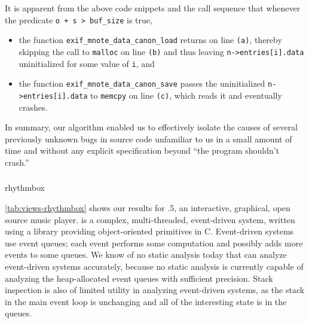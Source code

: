 It is apparent from the above code snippets and the
call sequence that whenever the predicate \texttt{o + s > buf\_size} is true,
\begin{itemize}
\item the function \texttt{exif\_mnote\_data\_canon\_load} returns on
  line \texttt{(a)}, thereby skipping the call to \texttt{malloc} on
  line \texttt{(b)} and thus leaving \texttt{n->entries[i].data}
  uninitialized for some value of \texttt{i}, and

\item the function \texttt{exif\_mnote\_data\_canon\_save} passes the
  uninitialized \texttt{n->entries[i].data} to \texttt{memcpy} on line \texttt{(c)}, which reads it and eventually crashes.
\end{itemize}

In summary, our algorithm enabled us to effectively isolate the causes
of several previously unknown bugs in source code unfamiliar to us in
a small amount of time and without any explicit specification beyond
``the program shouldn't crash.''

\subsubsection{\rhythmbox}

\begingroup
\setlength{\segunit}{10pt}
\begin{view}[\tiny]{\rhythmbox}{rhythmbox}
  
\end{view}
\endgroup

\autoref{tab:views-rhythmbox} shows our results for .5,
an interactive, graphical, open source music player.  \rhythmbox is a
complex, multi-threaded, event-driven system, written using a library
providing object-oriented primitives in C.  Event-driven systems use
event queues; each event performs some computation and possibly adds
more events to some queues.  We know of no static analysis today that
can analyze event-driven systems accurately, because no static
analysis is currently capable of analyzing the heap-allocated event
queues with sufficient precision.  Stack inspection is also of
limited utility in analyzing event-driven systems, as the stack in the
main event loop is unchanging and all of the interesting state is in
the queues.

